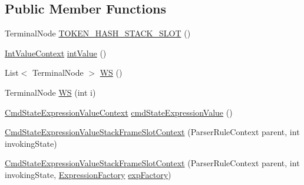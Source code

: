 \subsection*{Public Member Functions}
\begin{DoxyCompactItemize}
\item 
Terminal\+Node \hyperlink{classgov_1_1nasa_1_1jpf_1_1inspector_1_1server_1_1expression_1_1parser_1_1_expression_grammar_pa53e28d24e840d016fb7c58b2b73008ab_afe352897c52d5ff3a24fffbd4706d858}{T\+O\+K\+E\+N\+\_\+\+H\+A\+S\+H\+\_\+\+S\+T\+A\+C\+K\+\_\+\+S\+L\+OT} ()
\item 
\hyperlink{classgov_1_1nasa_1_1jpf_1_1inspector_1_1server_1_1expression_1_1parser_1_1_expression_grammar_parser_1_1_int_value_context}{Int\+Value\+Context} \hyperlink{classgov_1_1nasa_1_1jpf_1_1inspector_1_1server_1_1expression_1_1parser_1_1_expression_grammar_pa53e28d24e840d016fb7c58b2b73008ab_ad9c45cdcc198ee57b146ce4d517915af}{int\+Value} ()
\item 
List$<$ Terminal\+Node $>$ \hyperlink{classgov_1_1nasa_1_1jpf_1_1inspector_1_1server_1_1expression_1_1parser_1_1_expression_grammar_pa53e28d24e840d016fb7c58b2b73008ab_ae3c8a59a9dbb1387cfb74086806faecb}{WS} ()
\item 
Terminal\+Node \hyperlink{classgov_1_1nasa_1_1jpf_1_1inspector_1_1server_1_1expression_1_1parser_1_1_expression_grammar_pa53e28d24e840d016fb7c58b2b73008ab_a5fbc0bcd65b10446adb16cfdbe55d626}{WS} (int i)
\item 
\hyperlink{classgov_1_1nasa_1_1jpf_1_1inspector_1_1server_1_1expression_1_1parser_1_1_expression_grammar_pa17ff9e538e96e94398ba5af02b5ffa30}{Cmd\+State\+Expression\+Value\+Context} \hyperlink{classgov_1_1nasa_1_1jpf_1_1inspector_1_1server_1_1expression_1_1parser_1_1_expression_grammar_pa53e28d24e840d016fb7c58b2b73008ab_a158e5e231f55b8dfc6a15c79555119b5}{cmd\+State\+Expression\+Value} ()
\item 
\hyperlink{classgov_1_1nasa_1_1jpf_1_1inspector_1_1server_1_1expression_1_1parser_1_1_expression_grammar_pa53e28d24e840d016fb7c58b2b73008ab_a4c8e683d08117ac7ff88febed6c38baa}{Cmd\+State\+Expression\+Value\+Stack\+Frame\+Slot\+Context} (Parser\+Rule\+Context parent, int invoking\+State)
\item 
\hyperlink{classgov_1_1nasa_1_1jpf_1_1inspector_1_1server_1_1expression_1_1parser_1_1_expression_grammar_pa53e28d24e840d016fb7c58b2b73008ab_af8d42391f5dbd16ea3276f2ad506d3cb}{Cmd\+State\+Expression\+Value\+Stack\+Frame\+Slot\+Context} (Parser\+Rule\+Context parent, int invoking\+State, \hyperlink{classgov_1_1nasa_1_1jpf_1_1inspector_1_1server_1_1expression_1_1_expression_factory}{Expression\+Factory} \hyperlink{classgov_1_1nasa_1_1jpf_1_1inspector_1_1server_1_1expression_1_1parser_1_1_expression_grammar_pa53e28d24e840d016fb7c58b2b73008ab_a3fd2b0887da685e9703463ae544727db}{exp\+Factory})

\end{DoxyCompactItemize}

